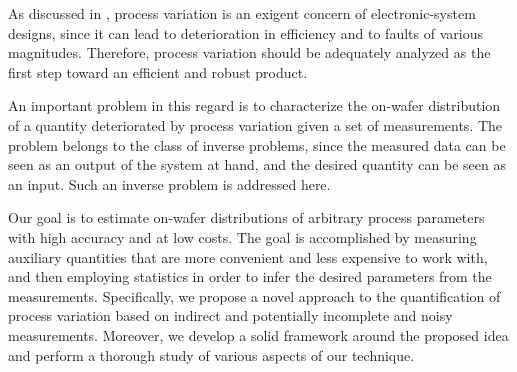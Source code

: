 As discussed in , process variation is an exigent
concern of electronic-system designs, since it can lead to deterioration in
efficiency and to faults of various magnitudes. Therefore, process variation
should be adequately analyzed as the first step toward an efficient and robust
product.

An important problem in this regard is to characterize the on-wafer distribution
of a quantity deteriorated by process variation given a set of measurements. The
problem belongs to the class of inverse problems, since the measured data can be
seen as an output of the system at hand, and the desired quantity can be seen as
an input. Such an inverse problem is addressed here.

Our goal is to estimate on-wafer distributions of arbitrary process parameters
with high accuracy and at low costs. The goal is accomplished by measuring
auxiliary quantities that are more convenient and less expensive to work with,
and then employing statistics in order to infer the desired parameters from the
measurements. Specifically, we propose a novel approach to the quantification of
process variation based on indirect and potentially incomplete and noisy
measurements. Moreover, we develop a solid framework around the proposed idea
and perform a thorough study of various aspects of our technique.
